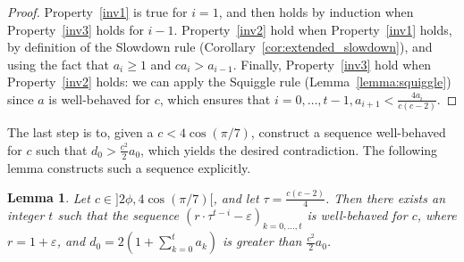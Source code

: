 \documentclass[a4paper, 11pt]{article}
\theoremstyle{plain}
\newtheorem{lemma}[theorem]{Lemma}
\theoremstyle{definition}
\theoremstyle{remark}
\newcommand{\eps}{\varepsilon}%
\begin{document}
\begin{proof}
	Property~\ref{inv1} is true for $i = 1$, and then holds by induction when Property~\ref{inv3}
	holds for $i-1$.
	Property~\ref{inv2} hold when Property~\ref{inv1} holds, 
	by definition of the Slowdown rule (Corollary~\ref{cor:extended_slowdown}),
	and using the fact that $a_i \ge 1$ and $ca_i > a_{i-1}$.
	Finally, Property~\ref{inv3} hold when Property~\ref{inv2} holds:
	we can apply the Squiggle rule (Lemma~\ref{lemma:squiggle}) since $a$ is well-behaved for $c$,
	which ensures that $i=0,\ldots,t-1, a_{i+1} < \frac{4a_i}{c(c-2)}$.
\end{proof}

The last step is to, given a $c < 4\cos(\pi/7)$, construct a sequence well-behaved for $c$
such that ${d_0} > \frac{c^2}{2}a_0$, which yields the desired contradiction.
The following lemma constructs such a sequence explicitly.
\begin{lemma}\label{lemma:construction}
	Let $c \in ]2\phi, 4\cos(\pi/7)[$, and let $\tau = \frac{c(c-2)}{4}$.
	Then there exists an integer $t$ such that the sequence
	$(r\cdot\tau^{t-i} - \eps)_{k=0,\ldots, t}$ is well-behaved for $c$, where $r = 1 + \eps$,
	and $d_0  = 2\left(1+\sum_{k=0}^t a_k\right)$ is greater than $\frac{c^2}{2}a_0$.
\end{lemma}
\end{document}

